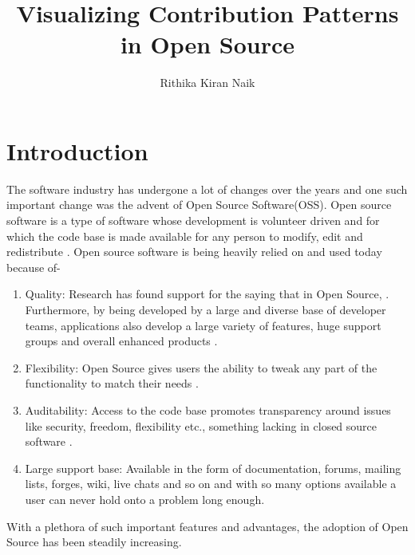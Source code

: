\documentclass[double,12pt]{beavtex}
\title{Visualizing Contribution Patterns in Open Source}
\author{Rithika Kiran Naik}
\begin{document}
\maketitle

\mainmatter

\chapter{Introduction}
The software industry has undergone a lot of changes over the years and one such important change was the advent of Open Source Software(OSS). Open source software is a type of software whose development  is volunteer driven \cite{ghosh2005} and for which the code base is made available for any person to modify, edit and redistribute \cite{osdef}. Open source software is being heavily relied on and used today because of-
\begin{enumerate}
\item Quality: Research has found support for the saying that in Open Source,  \cite{linuslaw}. Furthermore, by being developed by a large and diverse base of developer teams, applications also develop a large variety of features, huge support groups and overall enhanced products \cite{pcwr}. 
\item Flexibility: Open Source gives users the ability to tweak any part of the functionality to match their needs \cite{pcwr}. 
\item Auditability: Access to the code base promotes transparency around issues like security, freedom, flexibility etc., something lacking in closed source
software \cite{pcwr}. 
\item Large support base: Available in the form of documentation, forums, mailing lists, forges, wiki, live chats and so on and with so many options available a user can never hold onto a problem long enough. 
\end{enumerate}
With a plethora of such important features and advantages, the adoption of Open Source has been steadily increasing. 
\end{document}
